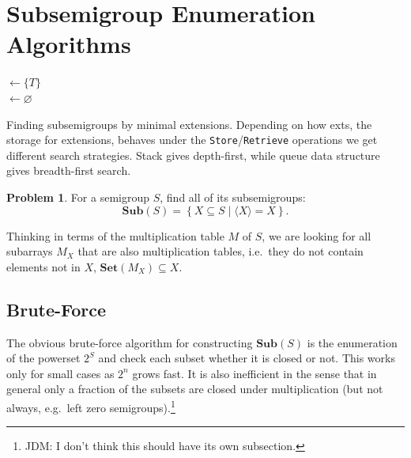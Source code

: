 \documentclass{amsart}
\newcommand{\Sub}{\mathbf{Sub}}
\newcommand{\Set}{\mathbf{Set}}
\theoremstyle{plain}
\theoremstyle{definition}
\newtheorem{problem}[theorem]{Problem}
\begin{document}
\section{Subsemigroup Enumeration Algorithms}
\label{sec:enum}
\begin{algorithm}[t]
\BlankLine
\Name{}
\subs $\leftarrow \{T\}$\\
\exts $\leftarrow \varnothing$\\
\Return \subs
\caption{Finding subsemigroups by minimal extensions. Depending on how \textsf{exts}, the storage for extensions, behaves under the \texttt{Store}/\texttt{Retrieve} operations we get different search strategies. Stack gives depth-first, while queue data structure gives breadth-first search.}
\label{alg:minclosure}
\end{algorithm}

\begin{problem}
For a semigroup $S$, find all of its subsemigroups:
$$\Sub(S)=\left\{ X\subseteq S\mid \langle X\rangle=X\right\}.$$
\end{problem}
Thinking in terms of the multiplication table $M$ of $S$, we are looking for all subarrays $M_X$ that are also multiplication tables, i.e.\ they do not contain elements not in $X$, $\Set(M_X)\subseteq X$.

\subsection{Brute-Force}
The obvious brute-force algorithm for constructing $\Sub(S)$ is the enumeration of the powerset $2^S$ and check each subset whether it is closed or not.
This works only for small cases as $2^n$ grows fast.
It is also inefficient in the sense that in general only a fraction of the
subsets are closed under multiplication (but not always, e.g.\ left zero
semigroups).\footnote{JDM: I don't think this should have its own subsection.}
 
\end{document}
